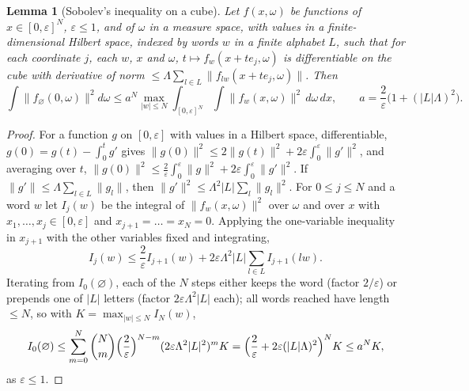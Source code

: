 \documentclass[10pt]{amsart}
\newtheorem{lemma}[theorem]{Lemma}
\theoremstyle{definition}
\theoremstyle{remark}
\begin{document}
\begin{lemma}[Sobolev's inequality on a cube]\label{pbo:sobolev}
Let $f(x,\omega)$ be functions of $x\in[0,\varepsilon]^N$, $\varepsilon\le1$, and of $\omega$ in a measure space,
with values in a finite-dimensional Hilbert space, indexed by words $w$ in a finite alphabet $L$, such
that for each coordinate $j$, each $w$, $x$ and $\omega$, $t\mapsto f_w(x+te_j,\omega)$ is differentiable on
the cube with derivative of norm $\le\Lambda\sum_{l\in L}\|f_{lw}(x+te_j,\omega)\|$. Then
\[
\int\|f_\varnothing(0,\omega)\|^2d\omega\le a^N\max_{|w|\le N}\int_{[0,\varepsilon]^N}\int\|f_w(x,\omega)\|^2\,d\omega\,
dx,\qquad a=\frac2\varepsilon\bigl(1+(|L|\Lambda)^2\bigr).
\]
\end{lemma}
\begin{proof}
For a function $g$ on $[0,\varepsilon]$ with values in a Hilbert space, differentiable, $g(0)=g(t)-\int_0^tg'$ gives
$\|g(0)\|^2\le2\|g(t)\|^2+2\varepsilon\int_0^\varepsilon\|g'\|^2$, and averaging over $t$, $\|g(0)\|^2\le\frac2\varepsilon
\int_0^\varepsilon\|g\|^2+2\varepsilon\int_0^\varepsilon\|g'\|^2$. If $\|g'\|\le\Lambda\sum_{l\in L}\|g_l\|$, then $\|g'\|^2\le
\Lambda^2|L|\sum_l\|g_l\|^2$. For $0\le j\le N$ and a word $w$ let $I_j(w)$ be the integral of $\|f_w(x,\omega)\|^2$
over $\omega$ and over $x$ with $x_1,\dots,x_j\in[0,\varepsilon]$ and $x_{j+1}=\dots=x_N=0$. Applying the one-variable
inequality in $x_{j+1}$ with the other variables fixed and integrating,
\[
I_j(w)\le\frac2\varepsilon I_{j+1}(w)+2\varepsilon\Lambda^2|L|\sum_{l\in L}I_{j+1}(lw).
\]
Iterating from $I_0(\varnothing)$, each of the $N$ steps either keeps the word (factor $2/\varepsilon$) or prepends
one of $|L|$ letters (factor $2\varepsilon\Lambda^2|L|$ each); all words reached have length $\le N$, so with
$K=\max_{|w|\le N}I_N(w)$,
\[
I_0(\varnothing)\le\sum_{m=0}^N\binom Nm\Bigl(\frac2\varepsilon\Bigr)^{N-m}(2\varepsilon\Lambda^2|L|^2)^mK=\Bigl(\frac2\varepsilon+
2\varepsilon(|L|\Lambda)^2\Bigr)^NK\le a^NK,
\]
as $\varepsilon\le1$.
\end{proof}
\end{document}
